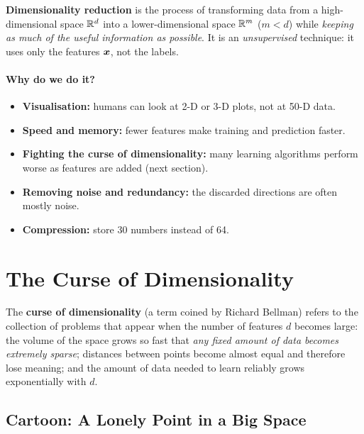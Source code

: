 \begin{definition}
\textbf{Dimensionality reduction} is the process of transforming data from a high-dimensional space $\mathbb{R}^{d}$ into a lower-dimensional space $\mathbb{R}^{m}$ ($m<d$) while \emph{keeping as much of the useful information as possible}. It is an \emph{unsupervised} technique: it uses only the features $\boldsymbol{x}$, not the labels.
\end{definition}

\paragraph{Why do we do it?}
\begin{itemize}
  \item \textbf{Visualisation:} humans can look at 2-D or 3-D plots, not at 50-D data.
  \item \textbf{Speed and memory:} fewer features make training and prediction faster.
  \item \textbf{Fighting the curse of dimensionality:} many learning algorithms perform worse as features are added (next section).
  \item \textbf{Removing noise and redundancy:} the discarded directions are often mostly noise.
  \item \textbf{Compression:} store 30 numbers instead of 64.
\end{itemize}

\section{The Curse of Dimensionality}

\begin{definition}
The \textbf{curse of dimensionality} (a term coined by Richard Bellman) refers to the collection of problems that appear when the number of features $d$ becomes large: the volume of the space grows so fast that \emph{any fixed amount of data becomes extremely sparse}; distances between points become almost equal and therefore lose meaning; and the amount of data needed to learn reliably grows exponentially with $d$.
\end{definition}

\subsection{Cartoon: A Lonely Point in a Big Space}

